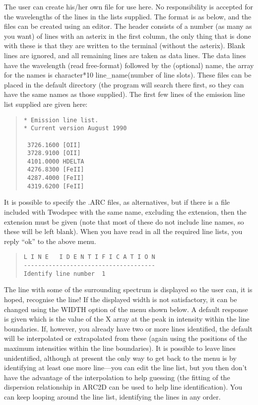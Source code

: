 The user can create his/her own file for use here.
No responsibility is accepted for the wavelengths of the lines in the
lists supplied.
The format is as below, and the files can be created using an editor.
The header consists of a number (as many as you want) of lines with an
asterix in the first column, the only thing that is done with
these is that they are written to the terminal (without the asterix).
Blank lines are ignored, and all remaining lines are taken as data lines.
The data lines have the wavelength (read free-format) followed by the
(optional) name, the array for the names is character*10 line\_name(number
of line slots).
These files can be placed in the default directory (the program will
search there first, so they can have the same names as those supplied).
The first few lines of the emission line list supplied are given here:

\begin{quote}\begin{verbatim}
* Emission line list.
* Current version August 1990

 3726.1600 [OII]
 3728.9100 [OII]
 4101.0000 HDELTA
 4276.8300 [FeII]
 4287.4000 [FeII]
 4319.6200 [FeII]
\end{verbatim}\end{quote}

It is possible to specify the  .ARC files, as alternatives, but if
there is a file included with Twodspec with the same name, excluding the
extension, then the extension must be given (note that most of these do
not include line names, so these will be left blank).
When you have read in all the required line lists, you reply ``ok'' to
the above menu.

\begin{quote}\begin{verbatim}
L I N E   I D E N T I F I C A T I O N
-------------------------------------
Identify line number  1
\end{verbatim}\end{quote}

The line with some of the surrounding spectrum is displayed so the user
can, it is hoped, recognise the line!
If the displayed width is not satisfactory, it can be changed using the
WIDTH option of the menu shown below.
A default response is given which is the value of the X array at the
peak in intensity within the line boundaries.
If, however, you already have two or more lines identified, the default
will be interpolated or extrapolated from these (again using the
positions of the maximum intensities within the line boundaries).
It is possible to leave lines unidentified, although at present the only
way to get back to the menu is by identifying at least one more
line---you can edit the line list, but you then don't have the advantage
of the interpolation to help guessing (the fitting of the dispersion
relationship in ARC2D can be used to help line identification).
You can keep looping around the line list, identifying the lines in any
order.
 
